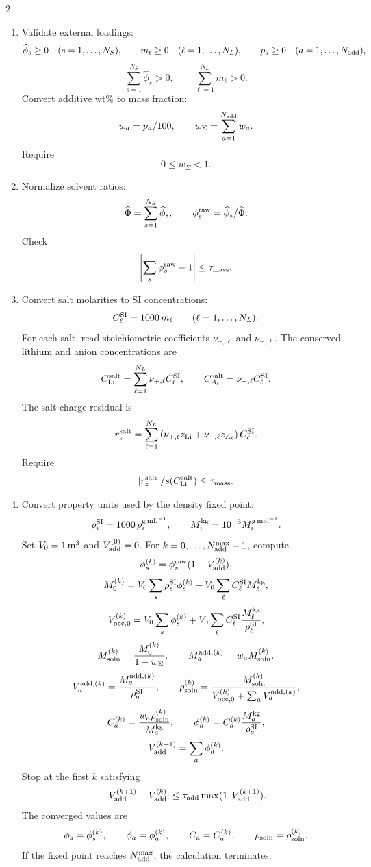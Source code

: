 \documentclass[10pt]{article}
\begin{document}
\begin{multicols}{2}
\begin{enumerate}[label=\textbf{A\arabic*.}]
\item Validate external loadings:
\[
\widehat\phi_s\ge0\quad(s=1,\ldots,N_S),
\qquad
m_\ell\ge0\quad(\ell=1,\ldots,N_L),
\qquad
p_a\ge0\quad(a=1,\ldots,N_{\rm add}),
\]
\[
\sum_{s=1}^{N_S}\widehat\phi_s>0,
\qquad
\sum_{\ell=1}^{N_L}m_\ell>0.
\]
Convert additive wt\% to mass fraction:
\[
w_a=p_a/100,
\qquad
w_\Sigma=\sum_{a=1}^{N_{\rm add}}w_a.
\]
Require
\[
0\le w_\Sigma<1.
\]

\item Normalize solvent ratios:
\[
\widehat\Phi=\sum_{s=1}^{N_S}\widehat\phi_s,
\qquad
\phi_s^{\rm raw}=\widehat\phi_s/\widehat\Phi.
\]
Check
\[
\left|\sum_s\phi_s^{\rm raw}-1\right|\le\tau_{\rm mass}.
\]

\item Convert salt molarities to SI concentrations:
\[
C_\ell^{\rm SI}=1000\,m_\ell
\qquad(\ell=1,\ldots,N_L).
\]
For each salt, read stoichiometric coefficients \(\nu_{+,\ell}\) and
\(\nu_{-,\ell}\). The conserved lithium and anion concentrations are
\[
C_{\rm Li}^{\rm salt}
=
\sum_{\ell=1}^{N_L}\nu_{+,\ell}C_\ell^{\rm SI},
\qquad
C_{A_\ell}^{\rm salt}
=
\nu_{-,\ell}C_\ell^{\rm SI}.
\]
The salt charge residual is
\[
r_z^{\rm salt}
=
\sum_{\ell=1}^{N_L}
\left(
\nu_{+,\ell}z_{\rm Li}
+
\nu_{-,\ell}z_{A_\ell}
\right)C_\ell^{\rm SI}.
\]
Require
\[
|r_z^{\rm salt}|/s(C_{\rm Li}^{\rm salt})\le\tau_{\rm mass}.
\]

\item Convert property units used by the density fixed point:
\[
\rho_i^{\rm SI}=1000\,\rho_i^{\rm g\,mL^{-1}},
\qquad
M_i^{\rm kg}=10^{-3}M_i^{\rm g\,mol^{-1}}.
\]
Set \(V_0=1\,{\rm m^3}\) and \(V_{\rm add}^{(0)}=0\). For
\(k=0,\ldots,N_{\rm add}^{\max}-1\), compute
\[
\phi_s^{(k)}=\phi_s^{\rm raw}(1-V_{\rm add}^{(k)}),
\]
\[
M_0^{(k)}
=
V_0\sum_s\rho_s^{\rm SI}\phi_s^{(k)}
+
V_0\sum_\ell C_\ell^{\rm SI}M_\ell^{\rm kg},
\]
\[
V_{\rm occ,0}^{(k)}
=
V_0\sum_s\phi_s^{(k)}
+
V_0\sum_\ell C_\ell^{\rm SI}
\frac{M_\ell^{\rm kg}}{\rho_\ell^{\rm SI}},
\]
\[
M_{\rm soln}^{(k)}
=
\frac{M_0^{(k)}}{1-w_\Sigma},
\qquad
M_a^{{\rm add},(k)}
=
w_aM_{\rm soln}^{(k)},
\]
\[
V_a^{{\rm add},(k)}
=
\frac{M_a^{{\rm add},(k)}}{\rho_a^{\rm SI}},
\qquad
\rho_{\rm soln}^{(k)}
=
\frac{M_{\rm soln}^{(k)}}
{V_{\rm occ,0}^{(k)}+\sum_aV_a^{{\rm add},(k)}},
\]
\[
C_a^{(k)}
=
\frac{w_a\rho_{\rm soln}^{(k)}}{M_a^{\rm kg}},
\qquad
\phi_a^{(k)}
=
C_a^{(k)}
\frac{M_a^{\rm kg}}{\rho_a^{\rm SI}},
\]
\[
V_{\rm add}^{(k+1)}
=
\sum_a\phi_a^{(k)}.
\]
Stop at the first \(k\) satisfying
\[
|V_{\rm add}^{(k+1)}-V_{\rm add}^{(k)}|
\le
\tau_{\rm add}\max(1,V_{\rm add}^{(k+1)}).
\]
The converged values are
\[
\phi_s=\phi_s^{(k)},
\qquad
\phi_a=\phi_a^{(k)},
\qquad
C_a=C_a^{(k)},
\qquad
\rho_{\rm soln}=\rho_{\rm soln}^{(k)}.
\]
If the fixed point reaches \(N_{\rm add}^{\max}\), the calculation terminates.


\end{enumerate}
\end{multicols}
\end{document}
